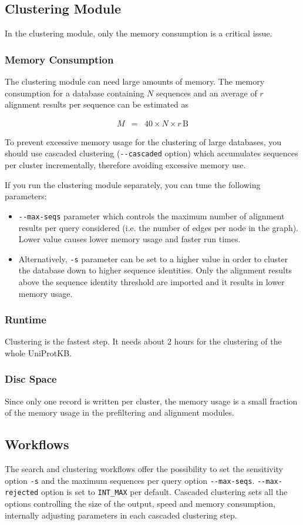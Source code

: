 \documentclass[11pt,a4paper]{scrreprt}
\begin{document}
\subsection{Clustering Module}
In the clustering module, only the memory consumption is a critical issue.
\subsubsection{Memory Consumption}
The clustering module can need large amounts of memory. The memory consumption for a database containing $N$ sequences and an average of $r$ alignment results per sequence can be estimated as


\begin{eqnarray*}
M & = & 40\times N\times r\,\mathrm{B}
\end{eqnarray*}
 
To prevent excessive memory usage for the clustering of large databases, you should use cascaded clustering (\texttt{-{}-cascaded} option) which accumulates sequences per cluster incrementally, therefore avoiding excessive memory use.


If you run the clustering module separately, you can tune the following parameters:
\begin{itemize}
\item \texttt{-{}-max-seqs} parameter which controls the maximum number of alignment results per query considered (i.e. the number of edges per node in the graph). Lower value causes lower memory usage and faster run times.
\item Alternatively, \texttt{-s} parameter can be set to a higher value in order to cluster the database down to higher sequence identities. Only the alignment results above the sequence identity threshold are imported and it results in lower memory usage. 
\end{itemize}
\subsubsection{Runtime}
Clustering is the fastest step. It needs about 2 hours for the clustering of the whole UniProtKB. 
\subsubsection{Disc Space}
Since only one record is written per cluster, the memory usage is a small fraction of the memory usage in the prefiltering and alignment modules.
\subsection{Workflows}
The search and clustering workflows offer the possibility to set the sensitivity option \texttt{-s} and the maximum sequences per query option \texttt{-{}-max-seqs}. \texttt{-{}-max-rejected} option is set to \texttt{INT\_MAX} per default. Cascaded clustering sets all the options controlling the size of the output, speed and memory consumption, internally adjusting parameters in each cascaded clustering step.
\end{document}

